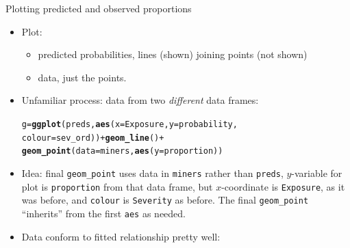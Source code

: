 \documentclass[unknownkeysallowed]{beamer}\usepackage[]{graphicx}\usepackage[]{color}
\makeatletter
\newcommand{\hlopt}[1]{\textcolor[rgb]{0,0,0}{#1}}%
\newcommand{\hlstd}[1]{\textcolor[rgb]{0.345,0.345,0.345}{#1}}%
\newcommand{\hlkwb}[1]{\textcolor[rgb]{0.69,0.353,0.396}{#1}}%
\newcommand{\hlkwc}[1]{\textcolor[rgb]{0.333,0.667,0.333}{#1}}%
\newcommand{\hlkwd}[1]{\textcolor[rgb]{0.737,0.353,0.396}{\textbf{#1}}}%
\newenvironment{kframe}{%
 \def\at@end@of@kframe{}%
 \ifinner\ifhmode%
  \def\at@end@of@kframe{\end{minipage}}%
  \begin{minipage}{\columnwidth}%
 \fi\fi%
 \def\FrameCommand##1{\hskip\@totalleftmargin \hskip-\fboxsep
 \colorbox{shadecolor}{##1}\hskip-\fboxsep
     \hskip-\linewidth \hskip-\@totalleftmargin \hskip\columnwidth}%
 \MakeFramed {\advance\hsize-\width
   \@totalleftmargin\z@ \linewidth\hsize
   \@setminipage}}%
 {\par\unskip\endMakeFramed%
 \at@end@of@kframe}
\newenvironment{knitrout}{}{} %
\makeatother
\begin{document}
\begin{frame}[fragile]{Plotting predicted and observed proportions}
  
  \begin{itemize}
    \item Plot:
      \begin{itemize}
      \item  predicted probabilities, lines (shown) joining points (not shown)
      \item data, just the points. 
      \end{itemize}
  
  \item Unfamiliar process: data from two \emph{different} data frames:
  
\begin{knitrout}
\color{fgcolor}\begin{kframe}
\begin{alltt}
\hlstd{g}\hlkwb{=}\hlkwd{ggplot}\hlstd{(preds,}\hlkwd{aes}\hlstd{(}\hlkwc{x}\hlstd{=Exposure,}\hlkwc{y}\hlstd{=probability,}
    \hlkwc{colour}\hlstd{=sev_ord))} \hlopt{+} \hlkwd{geom_line}\hlstd{()} \hlopt{+}
  \hlkwd{geom_point}\hlstd{(}\hlkwc{data}\hlstd{=miners,}\hlkwd{aes}\hlstd{(}\hlkwc{y}\hlstd{=proportion))}
\end{alltt}
\end{kframe}
\end{knitrout}

\item Idea: final \texttt{geom\_point} uses data in \texttt{miners}
  rather than \texttt{preds}, $y$-variable for plot is \texttt{proportion}
  from that data frame, but $x$-coordinate is \texttt{Exposure}, as it
  was before, and \texttt{colour} is \texttt{Severity} as before. The
  final \texttt{geom\_point} ``inherits'' from the first \texttt{aes}
  as needed.
\item Data conform to fitted relationship pretty well:
  \end{itemize}
  
\end{frame}
\end{document}

